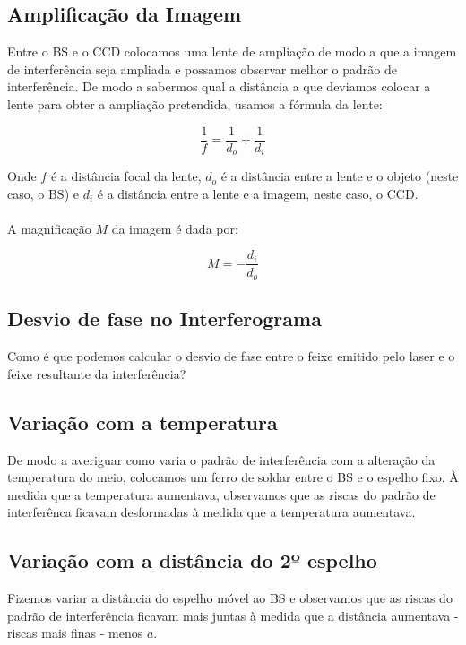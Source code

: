 \documentclass{article}
\begin{document}
\begin{multicols}{2}
\subsection{Amplificação da Imagem}

Entre o BS e o CCD colocamos uma lente de ampliação de modo a que a imagem de interferência seja ampliada e possamos observar melhor o padrão de interferência.
De modo a sabermos qual a distância a que deviamos colocar a lente para obter a ampliação pretendida, usamos a fórmula da lente:

\[ \frac{1}{f} = \frac{1}{d_o} + \frac{1}{d_i} \]

Onde $f$ é a distância focal da lente, $d_o$ é a distância entre a lente e o objeto (neste caso, o BS) e $d_i$ é a distância entre a lente e a imagem, neste caso, o CCD.
\paragraph{}
A magnificação $M$ da imagem é dada por:

\[ M = - \frac{d_i}{d_o} \]

\subsection{Desvio de fase no Interferograma}

Como é que podemos calcular o desvio de fase entre o feixe emitido pelo laser e o feixe resultante da interferência?

\subsection{Variação com a temperatura}

De modo a averiguar como varia o padrão de interferência com a alteração da temperatura do meio, colocamos um ferro de soldar entre o BS e o espelho fixo.
À medida que a temperatura aumentava, observamos que as riscas do padrão de interferênca ficavam desformadas à medida que a temperatura aumentava.

\subsection{Variação com a distância do 2º espelho}

Fizemos variar a distância do espelho móvel ao BS e observamos que as riscas do padrão de interferência ficavam mais juntas à medida que a distância aumentava - riscas mais finas - menos $a$.


\end{multicols}
\end{document}
